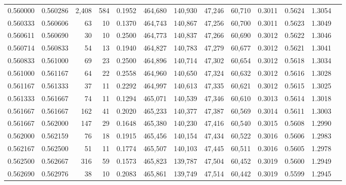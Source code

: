 \begin{tabular}{rrrrrrrrrrrrr}
0.560000 & 0.560286 & 2,408 & 584 &                                     0.1952 & 464,680 & 140,930 &  47,246 &  60,710 & 0.3011 & 0.5624 & 1.3054 \\
0.560333 & 0.560606 &    63 &  10 &                                     0.1370 & 464,743 & 140,867 &  47,256 &  60,700 & 0.3011 & 0.5623 & 1.3049 \\
0.560611 & 0.560690 &    30 &  10 &                                     0.2500 & 464,773 & 140,837 &  47,266 &  60,690 & 0.3012 & 0.5622 & 1.3046 \\
0.560714 & 0.560833 &    54 &  13 &                                     0.1940 & 464,827 & 140,783 &  47,279 &  60,677 & 0.3012 & 0.5621 & 1.3041 \\
0.560833 & 0.561000 &    69 &  23 &                                     0.2500 & 464,896 & 140,714 &  47,302 &  60,654 & 0.3012 & 0.5618 & 1.3034 \\
0.561000 & 0.561167 &    64 &  22 &                                     0.2558 & 464,960 & 140,650 &  47,324 &  60,632 & 0.3012 & 0.5616 & 1.3028 \\
0.561167 & 0.561333 &    37 &  11 &                                     0.2292 & 464,997 & 140,613 &  47,335 &  60,621 & 0.3012 & 0.5615 & 1.3025 \\
0.561333 & 0.561667 &    74 &  11 &                                     0.1294 & 465,071 & 140,539 &  47,346 &  60,610 & 0.3013 & 0.5614 & 1.3018 \\
0.561667 & 0.561667 &   162 &  41 &                                     0.2020 & 465,233 & 140,377 &  47,387 &  60,569 & 0.3014 & 0.5611 & 1.3003 \\
0.561667 & 0.562000 &   147 &  29 &                                     0.1648 & 465,380 & 140,230 &  47,416 &  60,540 & 0.3015 & 0.5608 & 1.2990 \\
0.562000 & 0.562159 &    76 &  18 &                                     0.1915 & 465,456 & 140,154 &  47,434 &  60,522 & 0.3016 & 0.5606 & 1.2983 \\
0.562167 & 0.562500 &    51 &  11 &                                     0.1774 & 465,507 & 140,103 &  47,445 &  60,511 & 0.3016 & 0.5605 & 1.2978 \\
0.562500 & 0.562667 &   316 &  59 &                                     0.1573 & 465,823 & 139,787 &  47,504 &  60,452 & 0.3019 & 0.5600 & 1.2949 \\
0.562690 & 0.562976 &    38 &  10 &                                     0.2083 & 465,861 & 139,749 &  47,514 &  60,442 & 0.3019 & 0.5599 & 1.2945 \\

\end{tabular}
